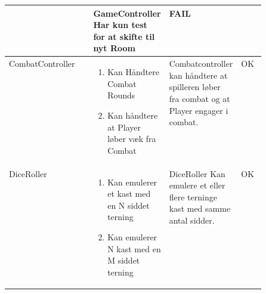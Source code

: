 \begin{center}
\begin{longtable}{|l|p{0.25\linewidth}|p{0.25\linewidth}|l|}
\begin{enumerate}
    \end{enumerate}
    &
    \flushleft 
    GameController Har kun test for at skifte til nyt Room
    &
    FAIL
    \\ \hline
    CombatController
    &
    \begin{enumerate}
      \item \begin{flushleft} Kan Håndtere Combat Rounds \end{flushleft}
      \item \begin{flushleft} Kan håndtere at Player løber væk fra Combat \end{flushleft}
    \end{enumerate}
    &
    \flushleft
    Combatcontroller kan håndtere at spilleren løber fra combat og at Player engager i combat.
    &
    OK
    \\ \hline
    DiceRoller
    &
    \begin{enumerate}
    \item \begin{flushleft} Kan emulerer et kast med en N siddet terning \end{flushleft}
    \item \begin{flushleft} Kan emulerer N kast med en M siddet terning \end{flushleft}
    \end{enumerate}
    &
    \flushleft
    DiceRoller Kan emulere et eller flere terninge kast med samme antal sidder.
    &
    OK
    \\ \hline
\end{longtable}
  \addtocounter{table}{-1}
\end{center}
